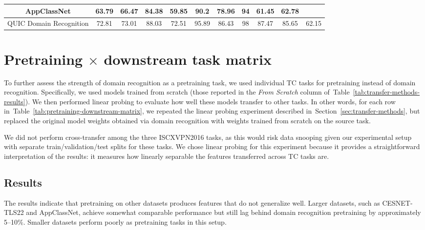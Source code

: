 \documentclass[lettersize,journal,twoside,article]{IEEEtran}
\newcommand{\secref}[1]{Section~\ref{#1}}
\newcommand{\tabref}[1]{Table~\ref{#1}}
\begin{document}
\begin{table}[!ht]
\begin{NiceTabular}{|c|*{10}{c|}}
    AppClassNet & 63.79 & 66.47 & 84.38 & 59.85 & 90.2 & 78.96 & 94 & 61.45 & 62.78 &  \\ \hline
      QUIC Domain Recognition &  72.81 &  73.01 &  88.03 &  72.51 &  95.89 &  86.43 &  98 &  87.47 &  85.65  &  62.15 \\ \hline
    \end{NiceTabular}
\end{table}

\section{\texorpdfstring{Pretraining $\times$ downstream task matrix}{Pretraining x downstream task matrix}}
\label{ap:pretraining-matrix}

To further assess the strength of domain recognition as a pretraining task, we used individual TC tasks for pretraining instead of domain recognition. Specifically, we used models trained from scratch (those reported in the \textit{From Scratch} column of~\tabref{tab:transfer-methods-results}). We then performed linear probing to evaluate how well these models transfer to other tasks. In other words, for each row in~\tabref{tab:pretraining-downstream-matrix}, we repeated the linear probing experiment described in~\secref{sec:transfer-methods}, but replaced the original model weights obtained via domain recognition with weights trained from scratch on the source task.

We did not perform cross-transfer among the three ISCXVPN2016 tasks, as this would risk data snooping given our experimental setup with separate train/validation/test splits for these tasks. We chose linear probing for this experiment because it provides a straightforward interpretation of the results: it measures how linearly separable the features transferred across TC tasks are.

\subsection{Results}

The results indicate that pretraining on other datasets produces features that do not generalize well. Larger datasets, such as CESNET-TLS22 and AppClassNet, achieve somewhat comparable performance but still lag behind domain recognition pretraining by approximately 5--10\%. Smaller datasets perform poorly as pretraining tasks in this setup.
\end{document}
